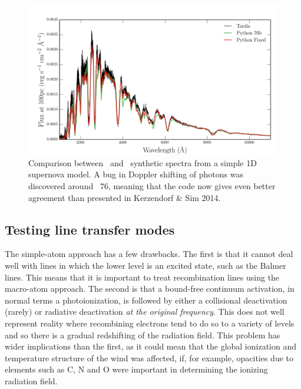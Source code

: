 \begin{figure}
\centering
\includegraphics[width=1.0\textwidth]{figures/03-radtrans/tardispython_thesis.png}
\caption[Comparison between \tar\ and \py\ synthetic spectra from 
a simple 1D supernova model.]
{
Comparison between \tar\ and \py\ synthetic spectra from 
a simple 1D supernova model. A bug in Doppler shifting of
photons was discovered around \py\ 76, meaning that the code now gives
even better agreement than presented in Kerzendorf \& Sim 2014.
}
\label{fig:tardis_spec}
\end{figure}

\subsection{Testing line transfer modes}

The simple-atom approach has a few drawbacks. The first is that it cannot
deal well with lines in which the lower level is an excited state, such as the 
Balmer lines. This means that it is important to treat recombination lines using the 
macro-atom approach. The second is that a bound-free continuum activation, 
in normal terms a photoionization, is followed by either a collisional 
deactivation (rarely) or radiative deactivation
{\em at the original frequency}. This does not well represent reality where recombining
electrons tend to do so to a variety of levels and so there is a gradual
redshifting of the radiation field. This problem has wider implications than
the first, as it could mean that the global ionization and temperature structure of the wind
was affected, if, for example, opacities due to elements such as C, N and O were important
in determining the ionizing radiation field.

